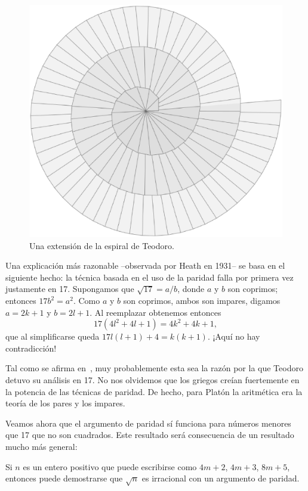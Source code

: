 \begin{figure}[h]
		\centering
		\includegraphics[scale=0.2]{images/infinita}
		\caption{Una extensión de la espiral de Teodoro.}
		\label{fig:espiral_infinita}
\end{figure}

Una explicación más razonable --observada
por Heath en 1931-- se basa en el siguiente hecho: la técnica basada en el uso
de la paridad falla por primera vez justamente en 17.  Supongamos que
$\sqrt{17}=a/b$, donde $a$ y $b$ son coprimos; entonces $17b^2=a^2$. Como $a$ y
$b$ son coprimos, ambos son impares, digamos $a=2k+1$ y $b=2l+1$. Al reemplazar
obtenemos entonces
\[
	17(4l^2+4l+1)=4k^2+4k+1,
\]
que al simplificarse queda $17l(l+1)+4=k(k+1)$. ¡Aquí no hay contradicción!

Tal como se afirma en~\cite{MR0416824}, muy probablemente esta sea la razón por
la que Teodoro detuvo su análisis en 17. No nos olvidemos que los griegos
creían fuertemente en la potencia de las técnicas de paridad. De hecho, para
Platón la aritmética era la teoría de los pares y los impares. 

Veamos ahora que el argumento de paridad sí funciona para números menores que
17 que no son cuadrados. Este resultado será consecuencia de un resultado mucho
más general:

\begin{theorem}
	Si $n$ es un entero positivo que puede escribirse como $4m+2$, $4m+3$,
	$8m+5$, entonces puede demostrarse que $\sqrt{n}$ es irracional con un
	argumento de paridad.
\end{theorem}

